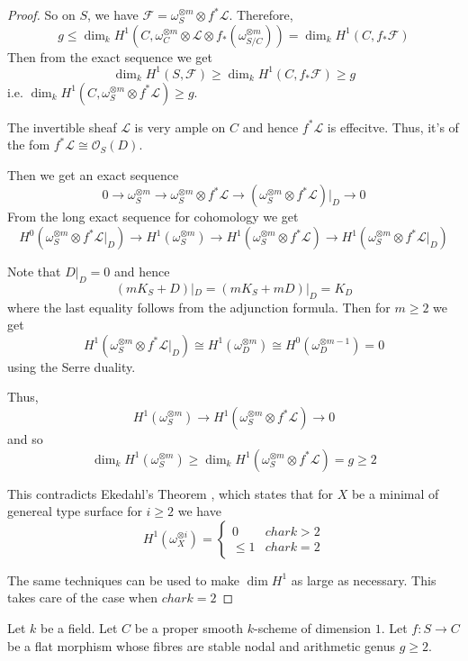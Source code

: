 \begin{proof}
So on $S$, we have $\mathcal{F}=\omega_S^{\otimes m}\otimes f^*\mathcal{L}$. Therefore, $$g\leq \dim_k H^1(C, \omega^{\otimes m}_C\otimes \mathcal{L}\otimes f_*(\omega^{\otimes m}_{S/C}))=\dim_k H^1(C, f_*\mathcal{F})$$ Then from the exact sequence we get $$\dim_k H^1(S,\mathcal{F})\geq \dim_k H^1(C, f_*\mathcal{F})\geq g$$ i.e. $\dim_k H^1(C, \omega_S^{\otimes m}\otimes f^*\mathcal{L})\geq g$. 

The invertible sheaf $\mathcal{L}$ is very ample on $C$ and hence $f^*\mathcal{L}$ is effecitve. Thus, it's of the fom $f^*\mathcal{L}\cong \mathcal{O}_S(D)$.

Then we get an exact sequence $$0\to \omega_S^{\otimes m}\to \omega^{\otimes m}_S\otimes f^*\mathcal{L}\to (\omega_S^{\otimes m}\otimes f^*\mathcal{L})|_D\to 0$$ From the long exact sequence for cohomology we get $$H^0(\omega^{\otimes m}_S\otimes f^*\mathcal{L}|_D)\to H^1(\omega_S^{\otimes m})\to H^1(\omega_S^{\otimes m}\otimes f^*\mathcal{L})\to H^1(\omega_S^{\otimes m}\otimes f^*\mathcal{L}|_D)$$

Note that $D|_D=0$ and hence $$(mK_S+D)|_D=(mK_S+mD)|_D=K_D$$ where the last equality follows from the adjunction formula. Then for $m\geq 2$ we get $$H^1(\omega_S^{\otimes m}\otimes f^*\mathcal{L}|_D)\cong H^1(\omega_D^{\otimes m})\cong H^0(\omega_D^{\otimes m-1})=0$$ using the Serre duality. 

Thus, $$H^1(\omega_S^{\otimes m})\to H^1(\omega_S^{\otimes m}\otimes f^*\mathcal{L})\to 0$$ and so $$\dim_k H^1(\omega_S^{\otimes m})\geq \dim_k H^1(\omega_S^{\otimes m}\otimes f^*\mathcal{L})=g\geq 2$$

This contradicts Ekedahl's Theorem , which states that for $X$ be a minimal of genereal type surface for $i\geq 2$ we have $$H^1(\omega_X^{\otimes i})=\begin{cases} 0 &char k>2\\ \leq 1 & char k=2\end{cases}$$

The same techniques can be used to make $\dim H^1$ as large as necessary. This takes care of the case when $char k=2$
\end{proof}


\begin{lemma}
\label{lemma-stable-curves-semipositive-resolve}
Let $k$ be a field.
Let $C$ be a proper smooth $k$-scheme of dimension $1$.
Let $f : S \to C$ be a flat morphism whose fibres are stable nodal and arithmetic
genus $g \geq 2$.
\end{lemma}

